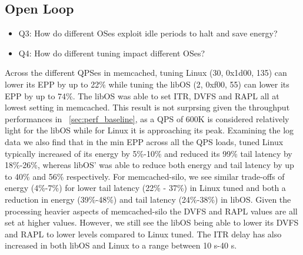 \subsection{Open Loop}
\label{sec:q2}
\begin{itemize}
\item Q3: How do different OSes exploit idle periods to halt and save energy?
\item Q4: How do different tuning impact different OSes?
\end{itemize}


Across the different QPSes in memcached, tuning Linux (30, 0x1d00, 135) can lower its EPP by up to 22\% while tuning the libOS (2, 0xf00, 55) can lower its EPP by up to 74\%. The libOS was able to set ITR, DVFS and RAPL all at lowest setting in memcached. This result is not surprsing given the throughput performances in ~\ref{sec:perf_baseline}, as a QPS of 600K is considered relatively light for the libOS while for Linux it is approaching its peak. Examining the log data we also find that in the min EPP across all the QPS loads, tuned Linux typically increased of its energy by 5\%-10\%  and reduced its 99\% tail latency by 18\%-26\%, whereas libOS' was able to reduce both energy and tail latency by up to 40\% and 56\% respectively. For memcached-silo, we see similar trade-offs of energy (4\%-7\%) for lower tail latency (22\% - 37\%) in Linux tuned and both a reduction in energy (39\%-48\%) and tail latency (24\%-38\%) in libOS. Given the processing heavier aspects of memcached-silo the DVFS and RAPL values are all set at higher values. However, we still see the libOS being able to lower its DVFS and RAPL to lower levels compared to Linux tuned. The ITR delay has also increased in both libOS and Linux to a range between 10 \micro s-40 \micro s.


